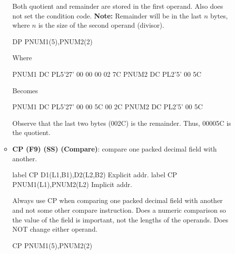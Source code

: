 \documentclass{report}
\begin{document}
\begin{itemize}
\begin{itemize}
                    \bigbreak \noindent 
                    Both quotient and remainder are stored in the first operand. Also does not set the condition code.
                    \bigbreak \noindent 
                    \textbf{Note:} Remainder will be in the last $n$ bytes, where $n$ is the size of the second operand (divisor).
                    \bigbreak \noindent 
                    \begin{cppcode}
                    DP PNUM1(5),PNUM2(2)
                    \end{cppcode}
                    \bigbreak \noindent 
                    Where
                    \bigbreak \noindent 
                    \begin{cppcode}
                        PNUM1 DC PL5'27'   00 00 00 02 7C
                        PNUM2 DC PL2'5'    00 5C
                    \end{cppcode}
                    \bigbreak \noindent 
                    Becomes
                    \bigbreak \noindent 
                    \begin{cppcode}
                        PNUM1 DC PL5'27'   00 00 5C 00 2C
                        PNUM2 DC PL2'5'    00 5C
                    \end{cppcode}
                    \bigbreak \noindent 
                    Observe that the last two bytes (002C) is the remainder. Thus, 00005C is the quotient.
                \item \textbf{CP (F9) (SS) (Compare)}: compare one packed decimal field with another.
                    \bigbreak \noindent 
                    \begin{cppcode}
                        label CP D1(L1,B1),D2(L2,B2) Explicit addr.
                        label CP PNUM1(L1),PNUM2(L2) Implicit addr.
                    \end{cppcode}
                    \bigbreak \noindent 
                    Always use CP when comparing one packed decimal field with another and not some other compare instruction.
                    \bigbreak \noindent 
                    Does a numeric comparison so the value of the field is important, not the lengths of the operands.
                    \bigbreak \noindent 
                    Does NOT change either operand.
                    \bigbreak \noindent 
                    \begin{cppcode}
                    CP PNUM1(5),PNUM2(2)
                    \end{cppcode}
                    \bigbreak \noindent 

\end{itemize}
\end{itemize}
\end{document}
